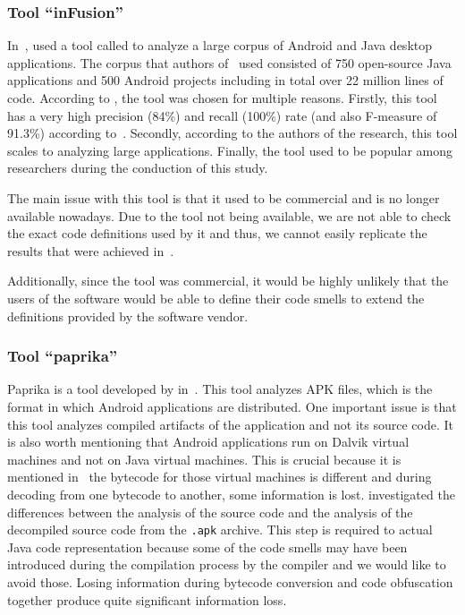 \subsubsection{Tool ``inFusion''}\label{subsec:toolsay}

In~\cite{mannan2016understanding}, \citeauthor{mannan2016understanding} used a tool called  to analyze a large
corpus of Android and Java desktop applications.
The corpus that authors of~\cite{mannan2016understanding} used consisted of 750 open-source Java applications and 500 Android projects including in total over 22 million lines of code.
According to \citeauthor{mannan2016understanding}, the tool was chosen for multiple reasons.
Firstly, this tool has a very high precision (84\%) and recall (100\%) rate (and also F-measure of 91.3\%) according to~\cite{ahmed2015empirical}.
Secondly, according to the authors of the research, this tool scales to analyzing large applications.
Finally, the tool used to be popular among researchers during the conduction of this study.

The main issue with this tool is that it used to be commercial and is no longer available nowadays.
Due to the tool not being available, we are not able to check the exact code definitions used by it and thus, we cannot
easily replicate the results that were achieved in~\cite{mannan2016understanding}.

Additionally, since the tool was commercial, it would be highly unlikely that the users of the software would
be able to define their code smells to extend the definitions provided by the software vendor.

\subsubsection{Tool ``paprika''}

Paprika is a tool developed by \citeauthor{paprika-paper} in~\cite{paprika-paper}.
This tool analyzes APK files, which is the format in which Android applications are distributed.
One important issue is that this tool analyzes compiled artifacts of the application and not its source code.
It is also worth mentioning that Android applications run on Dalvik virtual machines and not on Java virtual machines.
This is crucial because it is mentioned in~\cite{paprika-paper} the bytecode for those virtual machines is different and during decoding from one bytecode to another, some information is lost.
\citeauthor{mannan2016understanding} investigated the differences between the analysis of the source code
and the analysis of the decompiled source code from the \verb|.apk| archive.
This step is required to actual Java code representation because some of the code smells
may have been introduced during the compilation process by the compiler and we would like to avoid those.
Losing information during bytecode conversion and code obfuscation together produce quite significant information loss.

